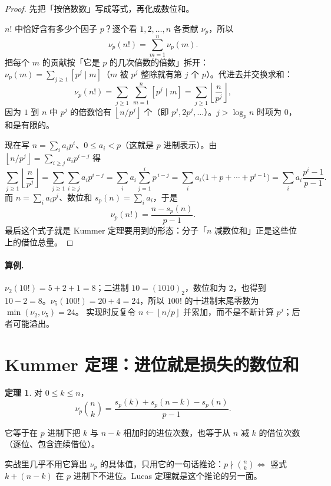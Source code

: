 \documentclass[UTF8,a4paper,11pt,twoside,openright,fontset=fandol]{ctexbook}
\theoremstyle{definition}
\newtheorem{theorem}[definition]{定理}
\newcommand{\floor}[1]{\left\lfloor #1\right\rfloor}
\newcommand{\iva}[1]{\left[#1\right]}
\begin{document}
\begin{proof}
先把「按倍数数」写成等式，再化成数位和。

$n!$ 中恰好含有多少个因子 $p$？逐个看 $1,2,\ldots,n$ 各贡献 $\nu_p$，所以
\[
 \nu_p(n!)=\sum_{m=1}^{n}\nu_p(m).
\]
把每个 $m$ 的贡献按「它是 $p$ 的几次倍数的倍数」拆开：$\nu_p(m)=\sum_{j\ge1}\iva{p^j\mid m}$（$m$ 被 $p^j$ 整除就有第 $j$ 个 $p$）。代进去并交换求和：
\[
 \nu_p(n!)=\sum_{j\ge1}\ \sum_{m=1}^{n}\iva{p^j\mid m}=\sum_{j\ge1}\floor{\frac{n}{p^j}},
\]
因为 $1$ 到 $n$ 中 $p^j$ 的倍数恰有 $\floor{n/p^j}$ 个（即 $p^j,2p^j,\ldots$）。$j>\log_p n$ 时项为 $0$，和是有限的。

现在写 $n=\sum_i a_ip^i$、$0\le a_i<p$（这就是 $p$ 进制表示）。由 $\floor{n/p^j}=\sum_{i\ge j}a_ip^{i-j}$ 得
\[
 \sum_{j\ge1}\floor{\frac{n}{p^j}}
 =\sum_{j\ge1}\sum_{i\ge j}a_ip^{i-j}
 =\sum_{i}a_i\sum_{j=1}^{i}p^{\,i-j}
 =\sum_i a_i\big(1+p+\cdots+p^{i-1}\big)
 =\sum_i a_i\frac{p^i-1}{p-1}.
\]
而 $n=\sum_i a_ip^i$、数位和 $s_p(n)=\sum_i a_i$，于是
\[
 \nu_p(n!)=\frac{n-s_p(n)}{p-1}.
\]
最后这个式子就是 Kummer 定理要用到的形态：分子「$n$ 减数位和」正是这些位上的借位总量。
\end{proof}

\paragraph{算例.} $\nu_2(10!)=5+2+1=8$；二进制 $10=(1010)_2$，数位和为 $2$，也得到 $10-2=8$。$\nu_5(100!)=20+4=24$，所以 $100!$ 的十进制末尾零数为 $\min(\nu_2,\nu_5)=24$。
实现时反复令 $n\gets\floor{n/p}$ 并累加，而不是不断计算 $p^j$；后者可能溢出。


\section{Kummer 定理：进位就是损失的数位和}
\begin{theorem}
对 $0\le k\le n$，
\[
\nu_p\binom nk=\frac{s_p(k)+s_p(n-k)-s_p(n)}{p-1}.
\]


它等于在 $p$ 进制下把 $k$ 与 $n-k$ 相加时的进位次数，也等于从 $n$ 减 $k$ 的借位次数（逐位、包含连续借位）。
\end{theorem}

\begin{tip}
实战里几乎不用它算出 $\nu_p$ 的具体值，只用它的一句话推论：$p\nmid\binom nk\iff$ 竖式 $k+(n-k)$ 在 $p$ 进制下不进位。Lucas 定理就是这个推论的另一面。
\end{tip}
\end{document}
